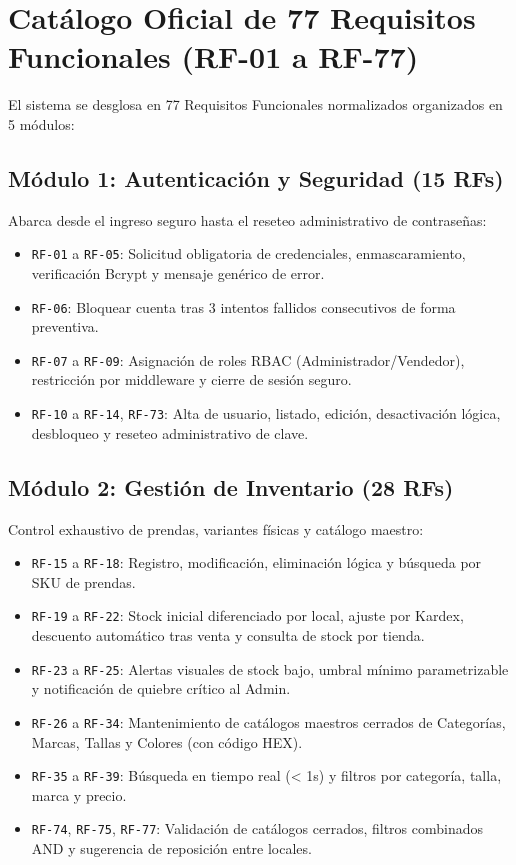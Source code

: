 \section{Catálogo Oficial de 77 Requisitos Funcionales (RF-01 a RF-77)}
El sistema se desglosa en 77 Requisitos Funcionales normalizados organizados en 5 módulos:

\subsection{Módulo 1: Autenticación y Seguridad (15 RFs)}
Abarca desde el ingreso seguro hasta el reseteo administrativo de contraseñas:
\begin{itemize}
    \item \texttt{RF-01} a \texttt{RF-05}: Solicitud obligatoria de credenciales, enmascaramiento, verificación Bcrypt y mensaje genérico de error.
    \item \texttt{RF-06}: Bloquear cuenta tras 3 intentos fallidos consecutivos de forma preventiva.
    \item \texttt{RF-07} a \texttt{RF-09}: Asignación de roles RBAC (Administrador/Vendedor), restricción por middleware y cierre de sesión seguro.
    \item \texttt{RF-10} a \texttt{RF-14}, \texttt{RF-73}: Alta de usuario, listado, edición, desactivación lógica, desbloqueo y reseteo administrativo de clave.
\end{itemize}

\subsection{Módulo 2: Gestión de Inventario (28 RFs)}
Control exhaustivo de prendas, variantes físicas y catálogo maestro:
\begin{itemize}
    \item \texttt{RF-15} a \texttt{RF-18}: Registro, modificación, eliminación lógica y búsqueda por SKU de prendas.
    \item \texttt{RF-19} a \texttt{RF-22}: Stock inicial diferenciado por local, ajuste por Kardex, descuento automático tras venta y consulta de stock por tienda.
    \item \texttt{RF-23} a \texttt{RF-25}: Alertas visuales de stock bajo, umbral mínimo parametrizable y notificación de quiebre crítico al Admin.
    \item \texttt{RF-26} a \texttt{RF-34}: Mantenimiento de catálogos maestros cerrados de Categorías, Marcas, Tallas y Colores (con código HEX).
    \item \texttt{RF-35} a \texttt{RF-39}: Búsqueda en tiempo real (< 1s) y filtros por categoría, talla, marca y precio.
    \item \texttt{RF-74}, \texttt{RF-75}, \texttt{RF-77}: Validación de catálogos cerrados, filtros combinados AND y sugerencia de reposición entre locales.
\end{itemize}

